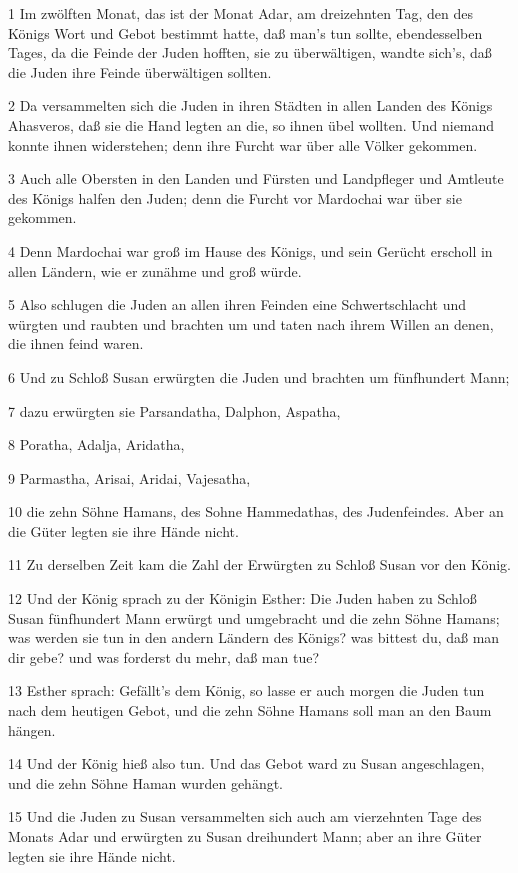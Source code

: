 \par 1 Im zwölften Monat, das ist der Monat Adar, am dreizehnten Tag, den des Königs Wort und Gebot bestimmt hatte, daß man's tun sollte, ebendesselben Tages, da die Feinde der Juden hofften, sie zu überwältigen, wandte sich's, daß die Juden ihre Feinde überwältigen sollten.
\par 2 Da versammelten sich die Juden in ihren Städten in allen Landen des Königs Ahasveros, daß sie die Hand legten an die, so ihnen übel wollten. Und niemand konnte ihnen widerstehen; denn ihre Furcht war über alle Völker gekommen.
\par 3 Auch alle Obersten in den Landen und Fürsten und Landpfleger und Amtleute des Königs halfen den Juden; denn die Furcht vor Mardochai war über sie gekommen.
\par 4 Denn Mardochai war groß im Hause des Königs, und sein Gerücht erscholl in allen Ländern, wie er zunähme und groß würde.
\par 5 Also schlugen die Juden an allen ihren Feinden eine Schwertschlacht und würgten und raubten und brachten um und taten nach ihrem Willen an denen, die ihnen feind waren.
\par 6 Und zu Schloß Susan erwürgten die Juden und brachten um fünfhundert Mann;
\par 7 dazu erwürgten sie Parsandatha, Dalphon, Aspatha,
\par 8 Poratha, Adalja, Aridatha,
\par 9 Parmastha, Arisai, Aridai, Vajesatha,
\par 10 die zehn Söhne Hamans, des Sohne Hammedathas, des Judenfeindes. Aber an die Güter legten sie ihre Hände nicht.
\par 11 Zu derselben Zeit kam die Zahl der Erwürgten zu Schloß Susan vor den König.
\par 12 Und der König sprach zu der Königin Esther: Die Juden haben zu Schloß Susan fünfhundert Mann erwürgt und umgebracht und die zehn Söhne Hamans; was werden sie tun in den andern Ländern des Königs? was bittest du, daß man dir gebe? und was forderst du mehr, daß man tue?
\par 13 Esther sprach: Gefällt's dem König, so lasse er auch morgen die Juden tun nach dem heutigen Gebot, und die zehn Söhne Hamans soll man an den Baum hängen.
\par 14 Und der König hieß also tun. Und das Gebot ward zu Susan angeschlagen, und die zehn Söhne Haman wurden gehängt.
\par 15 Und die Juden zu Susan versammelten sich auch am vierzehnten Tage des Monats Adar und erwürgten zu Susan dreihundert Mann; aber an ihre Güter legten sie ihre Hände nicht.
